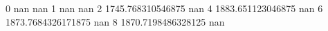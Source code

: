 0 nan nan
1 nan nan
2 1745.768310546875 nan
4 1883.651123046875 nan
6 1873.7684326171875 nan
8 1870.7198486328125 nan
